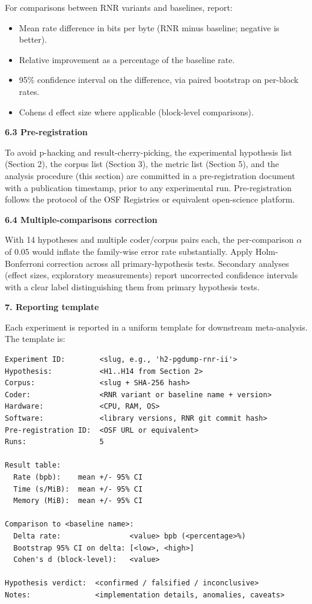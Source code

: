 \documentclass[
]{article}
\begin{document}
For comparisons between RNR variants and baselines, report:

\begin{itemize}
\item
  Mean rate difference in bits per byte (RNR minus baseline; negative is
  better).
\item
  Relative improvement as a percentage of the baseline rate.
\item
  95\% confidence interval on the difference, via paired bootstrap on
  per-block rates.
\item
  Cohen\textquotesingle s d effect size where applicable (block-level
  comparisons).
\end{itemize}

\textbf{6.3 Pre-registration}

To avoid p-hacking and result-cherry-picking, the experimental
hypothesis list (Section 2), the corpus list (Section 3), the metric
list (Section 5), and the analysis procedure (this section) are
committed in a pre-registration document with a publication timestamp,
prior to any experimental run. Pre-registration follows the protocol of
the OSF Registries or equivalent open-science platform.

\textbf{6.4 Multiple-comparisons correction}

With 14 hypotheses and multiple coder/corpus pairs each, the
per-comparison $\alpha$ of $0.05$ would inflate the family-wise
error rate substantially. Apply Holm-Bonferroni correction across all
primary-hypothesis tests. Secondary analyses (effect sizes,
exploratory measurements) report uncorrected confidence intervals
with a clear label distinguishing them from primary hypothesis tests.

\textbf{7. Reporting template}

Each experiment is reported in a uniform template for downstream
meta-analysis. The template is:
\begin{verbatim}
Experiment ID:        <slug, e.g., 'h2-pgdump-rnr-ii'>
Hypothesis:           <H1..H14 from Section 2>
Corpus:               <slug + SHA-256 hash>
Coder:                <RNR variant or baseline name + version>
Hardware:             <CPU, RAM, OS>
Software:             <library versions, RNR git commit hash>
Pre-registration ID:  <OSF URL or equivalent>
Runs:                 5

Result table:
  Rate (bpb):    mean +/- 95% CI
  Time (s/MiB):  mean +/- 95% CI
  Memory (MiB):  mean +/- 95% CI

Comparison to <baseline name>:
  Delta rate:                <value> bpb (<percentage>%)
  Bootstrap 95% CI on delta: [<low>, <high>]
  Cohen's d (block-level):   <value>

Hypothesis verdict:  <confirmed / falsified / inconclusive>
Notes:               <implementation details, anomalies, caveats>
\end{verbatim}
\end{document}
